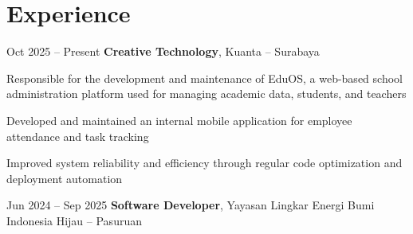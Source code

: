 \section{Experience}
\begin{twocolentrydate}{Oct 2025 -- Present}
	\textbf{Creative Technology}, Kuanta -- Surabaya
\end{twocolentrydate}

\vspace{0.10 cm}
\begin{onecolentry}
	\begin{highlights}
		\item Responsible for the development and maintenance of EduOS, a web-based school administration platform used for managing academic data, students, and teachers
		\item Developed and maintained an internal mobile application for employee attendance and task tracking
		\item Improved system reliability and efficiency through regular code optimization and deployment automation
	\end{highlights}
\end{onecolentry}

\vspace{0.5 cm}




\begin{twocolentrydate}{Jun 2024 -- Sep 2025}
	\textbf{Software Developer}, Yayasan Lingkar Energi Bumi Indonesia Hijau -- Pasuruan
\end{twocolentrydate}

